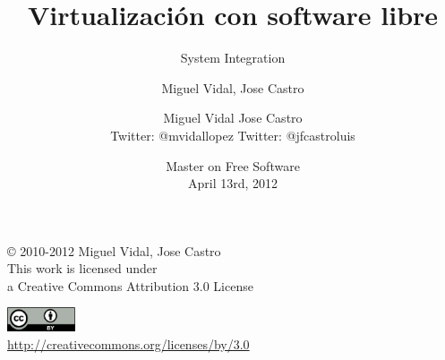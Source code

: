 \documentclass{beamer}
\begin{document}
\title{Virtualización con software libre}
\subtitle{System Integration}
\author{Miguel Vidal, Jose Castro} 
\date{\footnotesize{Master on Free Software \\ April 13rd, 2012}}
\author{Miguel Vidal \hspace{1cm} Jose Castro \\
\hspace{0.5mm} {\tiny Twitter: @mvidallopez \hspace{1.1cm}Twitter: @jfcastroluis}
}



\begin{frame}
  \vspace{2cm}
  \begin{flushright}
    {\small \copyright{} 2010-2012 Miguel Vidal, Jose Castro} \\
    \medskip
    {\scriptsize This work is licensed under \\ a Creative Commons Attribution 3.0 License}
  \end{flushright}
  \begin{flushright}
    \href{http://creativecommons.org/licenses/by/3.0/es}{\includegraphics[width=2cm]{format/cc-by.png}} \\
    {\tiny \url{http://creativecommons.org/licenses/by/3.0}}
  \end{flushright}
\end{frame}%

\usebackgroundtemplate{}

\end{document}
